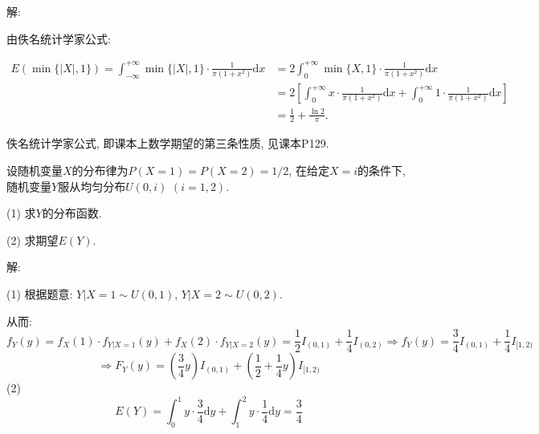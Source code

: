 \documentclass[standard]{ExBook}
\begin{document}
\begin{qitems}
\vspace{-5em}

    \begin{bbox}
解: 

由佚名统计学家公式:
\begin{center}
\begin{equation}
    \begin{array}{ll}
        \nonumber
E(\min\{|X|,1\})=\displaystyle\int_{-\infty}^{+\infty}\min\{|X|,1\}\cdot\frac{1}{\pi(1+x^2)}\mathrm{d}x & =\displaystyle 2\int_{0}^{+\infty}\min\{X,1\}\cdot\frac{1}{\pi(1+x^2)}\mathrm{d}x\\
& =\displaystyle 2\left[\int_{0}^{+\infty}x\cdot\frac{1}{\pi(1+x^2)}\mathrm{d}x+\int_{0}^{+\infty}1\cdot\frac{1}{\pi(1+x^2)}\mathrm{d}x\right]\\
& =\displaystyle \frac{1}{2}+\frac{\ln 2}{\pi}.
    \end{array}
\end{equation}
\end{center}
\textcolor{themeColor}{\selectfont {} 佚名统计学家公式, 即课本上数学期望的第三条性质, 见课本P129.}
    \end{bbox}

\vspace{-5em}

    \begin{bbox}
    \begin{shaded}
        \qitem
设随机变量$X$的分布律为$P(X=1)=P(X=2)=1/2$, 在给定$X=i$的条件下, 随机变量$Y$服从均匀分布$U(0,i)$ $(i=1,2)$.

(1) 求$Y$的分布函数.

(2) 求期望$E(Y)$.
    \end{shaded}
    \end{bbox}

\vspace{-5em}

    \begin{bbox}
解: 

(1) 根据题意: $Y|X=1\sim U(0,1)$, $Y|X=2\sim U(0,2)$.

从而:
$$f_{Y}(y)=f_{X}(1)\cdot f_{Y|X=1}(y)+f_{X}(2)\cdot f_{Y|X=2}(y)=\frac{1}{2}I_{(0,1)}+\frac{1}{4}I_{(0,2)} \Longrightarrow f_{Y}(y)=\frac{3}{4}I_{(0,1)}+\frac{1}{4}I_{[1,2)}$$
$$\Longrightarrow F_{Y}(y)=\left(\frac{3}{4}y\right)I_{(0,1)}+\left(\frac{1}{2}+\frac{1}{4}y\right)I_{[1,2)}$$
(2)
$$E(Y)=\displaystyle\int_{0}^{1}y\cdot\frac{3}{4}\mathrm{d}y+\int_{1}^{2}y\cdot\frac{1}{4}\mathrm{d}y=\frac{3}{4}$$
    \end{bbox}


\end{qitems}
\end{document}
